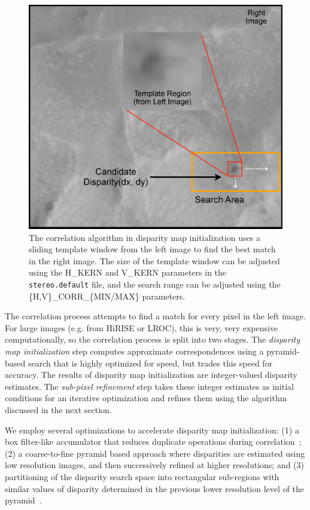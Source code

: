 \begin{figure}[bt]
  \centering
  \includegraphics[width=13cm]{images/correlation/correlation}
  \caption{The correlation algorithm in disparity map initialization
    uses a sliding template window from the left image to find the
    best match in the right image.  The size of the template window
    can be adjusted using the H\_KERN and V\_KERN parameters in the
    {\tt stereo.default} file, and the search range can be adjusted
    using the \{H,V\}\_CORR\_\{MIN/MAX\} parameters.}
  \label{fig:asp}
\end{figure}

The correlation process attempts to find a match for every pixel in
the left image.  For large images (e.g. from HiRISE or LROC), this is
very, very expensive computationally, so the correlation process is
split into two stages.  The {\em disparity map initialization} step
computes approximate correspondences using a pyramid-based search that
is highly optimized for speed, but trades this speed for accuracy.
The results of disparity map initialization are integer-valued
disparity estimates.  The {\em sub-pixel refinement} step takes these
integer estimates as initial conditions for an iterative optimization
and refines them using the algorithm discussed in the next section.

We employ several optimizations to accelerate disparity map
initialization: (1) a box filter-like accumulator that reduces
duplicate operations during correlation~\cite{Sun02rectangular}; (2) a
coarse-to-fine pyramid based approach where disparities are estimated
using low resolution images, and then successively refined at higher
resolutions; and (3) partitioning of the disparity search space into
rectangular sub-regions with similar values of disparity determined in
the previous lower resolution level of the
pyramid~\cite{Sun02rectangular}.

